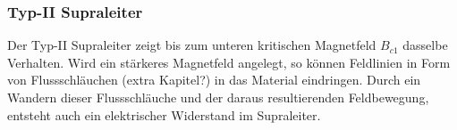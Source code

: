         \subsubsection{Typ-II Supraleiter}
Der Typ-II Supraleiter zeigt bis zum unteren kritischen Magnetfeld $B_{c1}$ 
dasselbe Verhalten. Wird ein stärkeres Magnetfeld angelegt, so können Feldlinien
in Form von Flussschläuchen (extra Kapitel?) in das Material eindringen. Durch
ein Wandern dieser Flussschläuche und der daraus resultierenden Feldbewegung,
entsteht auch ein elektrischer Widerstand im Supraleiter.

